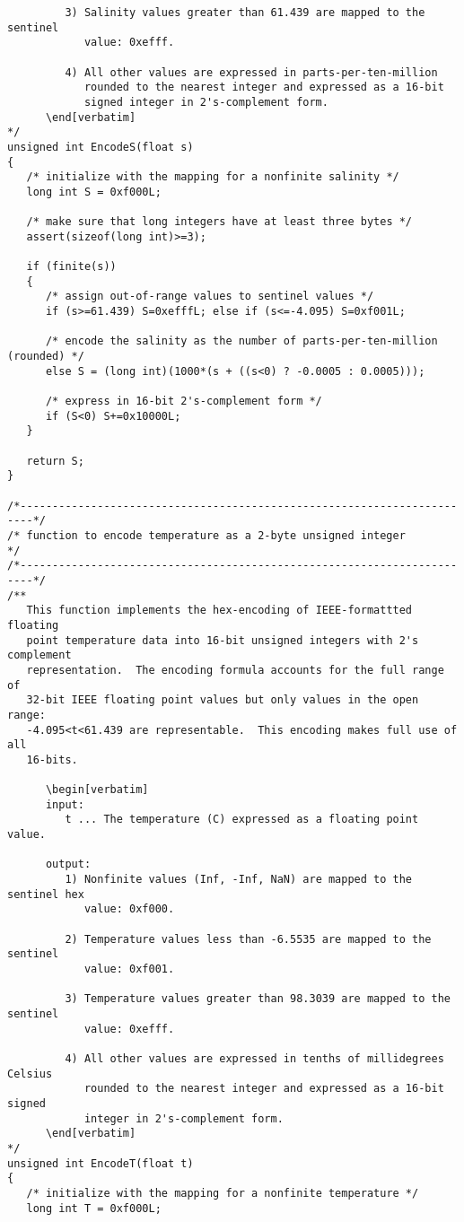 {\begin{verbatim}
         3) Salinity values greater than 61.439 are mapped to the sentinel
            value: 0xefff.

         4) All other values are expressed in parts-per-ten-million
            rounded to the nearest integer and expressed as a 16-bit
            signed integer in 2's-complement form.
      \end[verbatim]
*/
unsigned int EncodeS(float s)
{
   /* initialize with the mapping for a nonfinite salinity */
   long int S = 0xf000L;

   /* make sure that long integers have at least three bytes */
   assert(sizeof(long int)>=3);

   if (finite(s))
   {
      /* assign out-of-range values to sentinel values */
      if (s>=61.439) S=0xefffL; else if (s<=-4.095) S=0xf001L;

      /* encode the salinity as the number of parts-per-ten-million (rounded) */
      else S = (long int)(1000*(s + ((s<0) ? -0.0005 : 0.0005)));

      /* express in 16-bit 2's-complement form */
      if (S<0) S+=0x10000L;
   }
   
   return S;
}
 
/*------------------------------------------------------------------------*/
/* function to encode temperature as a 2-byte unsigned integer            */
/*------------------------------------------------------------------------*/
/**
   This function implements the hex-encoding of IEEE-formattted floating
   point temperature data into 16-bit unsigned integers with 2's complement
   representation.  The encoding formula accounts for the full range of
   32-bit IEEE floating point values but only values in the open range:
   -4.095<t<61.439 are representable.  This encoding makes full use of all
   16-bits.

      \begin[verbatim]
      input:
         t ... The temperature (C) expressed as a floating point value.

      output:
         1) Nonfinite values (Inf, -Inf, NaN) are mapped to the sentinel hex
            value: 0xf000.

         2) Temperature values less than -6.5535 are mapped to the sentinel
            value: 0xf001.

         3) Temperature values greater than 98.3039 are mapped to the sentinel
            value: 0xefff.

         4) All other values are expressed in tenths of millidegrees Celsius
            rounded to the nearest integer and expressed as a 16-bit signed 
            integer in 2's-complement form.
      \end[verbatim]
*/
unsigned int EncodeT(float t)
{
   /* initialize with the mapping for a nonfinite temperature */
   long int T = 0xf000L;


\end{verbatim}}
